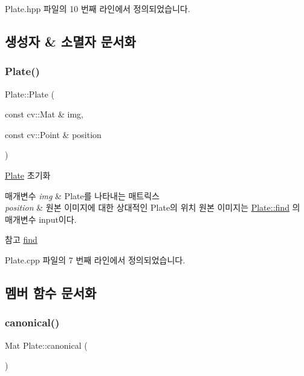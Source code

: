 Plate.\+hpp 파일의 10 번째 라인에서 정의되었습니다.



\subsection{생성자 \& 소멸자 문서화}
\mbox{\label{class_plate_a90e24aeb2c5f3120d3958999b5c673a7}} 
\subsubsection{\texorpdfstring{Plate()}{Plate()}}
{\footnotesize\ttfamily Plate\+::\+Plate (\begin{DoxyParamCaption}\item[{const cv\+::\+Mat \&}]{img,  }\item[{const cv\+::\+Point \&}]{position }\end{DoxyParamCaption})}



\hyperlink{class_plate}{Plate} 초기화 


\begin{DoxyParams}{매개변수}
{\em img} & Plate를 나타내는 매트릭스 \\
\hline
{\em position} & 원본 이미지에 대한 상대적인 Plate의 위치 원본 이미지는 \hyperlink{class_plate_a23487b8b0975634238eb338d994c9694}{Plate\+::find} 의 매개변수 input이다. \\
\hline
\end{DoxyParams}
\begin{DoxySeeAlso}{참고}
\hyperlink{class_plate_a23487b8b0975634238eb338d994c9694}{find} 
\end{DoxySeeAlso}


Plate.\+cpp 파일의 7 번째 라인에서 정의되었습니다.



\subsection{멤버 함수 문서화}
\mbox{\label{class_plate_a950683b0823941cc49dd1289ea1fa259}} 
\subsubsection{\texorpdfstring{canonical()}{canonical()}}
{\footnotesize\ttfamily Mat Plate\+::canonical (\begin{DoxyParamCaption}{ }\end{DoxyParamCaption})}



